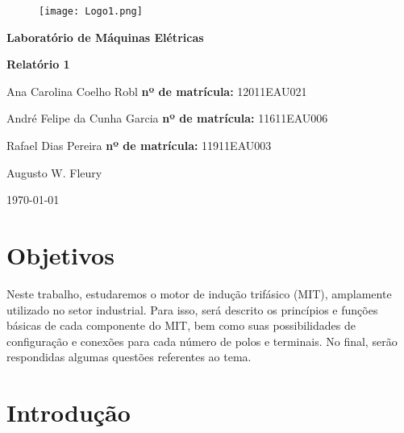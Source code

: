 \documentclass[a4paper,12pt,oneside]{article}
\begin{document}
\thispagestyle{empty}

\begin{center}
\begin{figure}\centering
\texttt{[image: Logo1.png]}
\end{figure}\*


\vspace{5cm}

{\Large\bfseries 
Laboratório de Máquinas Elétricas}

\vspace{0.5cm}

{\Large\bfseries 
Relatório 1}
\end{center}

\vspace{8cm}

 Ana Carolina Coelho Robl \hfill {\bfseries nº de matrícula:} 12011EAU021

 André Felipe da Cunha Garcia \hfill {\bfseries nº de matrícula:} 11611EAU006

 Rafael Dias Pereira \hfill {\bfseries nº de matrícula:} 11911EAU003

 Augusto W. Fleury

\vfill
\begin{center}
\large \today
\end{center}



\newpage
\tableofcontents\newpage
{}

\section{Objetivos}\hspace{0pt}

Neste trabalho, estudaremos o motor de indução trifásico (MIT), amplamente utilizado no setor industrial. Para isso, será descrito os princípios e funções básicas de cada componente do MIT, bem como suas possibilidades de configuração e conexões para cada número de polos e terminais. No final, serão respondidas algumas questões referentes ao tema.

\newpage
\section{Introdução}\hspace{0pt}
\end{document}
